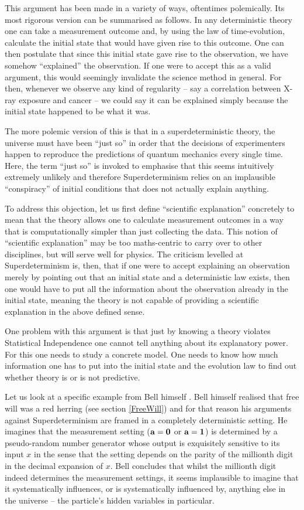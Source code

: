 \documentclass[12pt]{article}
\begin{document}
This argument has been made in a variety of ways, oftentimes polemically. Its most rigorous version can be summarised as follows. In any deterministic theory one can take a measurement outcome and, by using the law of time-evolution, calculate the initial state that would have given rise to this outcome. One can then postulate that since this initial state gave rise to the observation, we have somehow ``explained'' the observation. If one were to accept this as a valid argument, this would seemingly invalidate the science method in general. For then, whenever we observe any kind of regularity -- say a correlation between X-ray exposure and cancer -- we could say it can be explained simply because the initial state happened to be what it was.

The more polemic version of this is that in a superdeterministic theory, the universe must have been ``just so'' in order that the decisions of experimenters happen to reproduce the predictions of quantum mechanics every single time. Here, the term ``just so'' is invoked to emphasise that this seems intuitively extremely unlikely and therefore Superdeterminism relies on an implausible ``conspiracy'' of initial conditions that does not actually explain anything.

To address this objection, let us first define ``scientific explanation'' concretely to mean that the theory allows one to calculate measurement outcomes in a way that is computationally simpler than just collecting the data. This notion of  ``scientific explanation'' may be too maths-centric to carry over to other disciplines, but will serve well for physics. The criticism levelled at Superdeterminism is, then, that if one were to accept explaining an observation merely by pointing out that an initial state and a deterministic law exists, then one would have to put all the information about the observation already in the initial state, meaning the theory is not capable of providing a scientific explanation in the above defined sense.

One problem with this argument is that just by knowing a theory violates Statistical Independence one cannot tell anything about its explanatory power. For this one needs to study a concrete model. One needs to know how much information one has to put into the initial state and the evolution law to find out whether theory is or is not predictive. 

Let us look at a specific example from Bell himself \cite{Bell:1987hh}. Bell himself realised that free will was a red herring (see section \ref{FreeWill}) and for that reason his arguments against Superdeterminism are framed in a completely deterministic setting. He imagines that the measurement setting ($\bf a =0$ or $\bf a=1$) is determined by a pseudo-random number generator whose output is exquisitely sensitive to its input $x$ in the sense that the setting depends on the parity of the millionth digit in the decimal expansion of $x$. Bell concludes that whilst the millionth digit indeed determines the measurement settings, it seems implausible to imagine that it systematically influences, or is systematically influenced by, anything else in the universe -- the particle's hidden variables in particular. 
\end{document}
